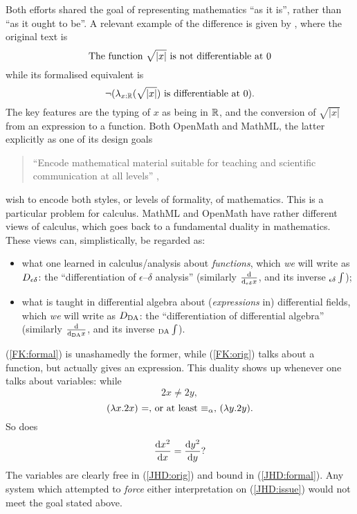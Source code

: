 \documentclass{llncs}
\begin{document}
Both efforts shared the goal of representing mathematics ``as it is'', rather
than ``as it ought to be''. A relevant example of the difference is given by
\cite{KamareddineNederpelt2004}, where the original text is 
\begin{equation}\label{FK:orig}
\hbox{The function }\sqrt{|x|} \hbox{ is not differentiable at 0}
\end{equation}
while its formalised equivalent is
\begin{equation}\label{FK:formal}
\lnot(\lambda_{x:\mathbb{R}}(\sqrt{|x|}) \hbox{ is differentiable at 0}).
\end{equation}
The key features are the typing of $x$ as being in $\mathbb{R}$, and the
conversion of $\sqrt{|x|}$ from an expression to a function. Both OpenMath and
MathML, the latter explicitly as one of its design goals
\begin{quote}
``Encode mathematical material suitable for teaching and scientific
communication at all levels'' \cite[1.2.4]{WorldWideWebConsortium2003b},
\end{quote}
wish to encode both styles, or levels of formality, of mathematics. This is a
particular problem for calculus.
MathML and OpenMath have rather different views of calculus, which goes back to a
fundamental duality in mathematics. These views can, simplistically, be regarded as:
\begin{itemize}
\item what one learned in calculus/analysis about {\it functions\/}, which
{\emph{we}} will write as $D_{\epsilon\delta}$: the
  ``differentiation of $\epsilon$--$\delta$ analysis'' (similarly $\frac{{\rm d}}{{\rm d}_{\epsilon\delta}x}$, and its
  inverse ${}_{\epsilon\delta}\int$);
\item what is taught in differential algebra about ({\it expressions\/} in)
differential fields, which {\emph{we}} will write as $D_{\rm DA}$: the
  ``differentiation of differential algebra'' (similarly $\frac{{\rm d}}{{\rm d}_{\rm DA}x}$, and
its inverse ${}_{\rm DA}\int$).
\end{itemize}
(\ref{FK:formal}) is unashamedly the former, while (\ref{FK:orig}) talks about
a function, but actually gives an expression. This duality shows up whenever
one talks about variables: while
\begin{equation}\label{JHD:orig}
2x \ne 2y,
\end{equation}
\begin{equation}\label{JHD:formal}
(\lambda x. 2x) \hbox{ =, or at least $\equiv_\alpha$, } (\lambda y. 2y).
\end{equation}
So does 
\begin{equation}\label{JHD:issue}
\frac{{\rm d} x^2}{{\rm d}x} = \frac{{\rm d}y^2}{{\rm d}y} ?
\end{equation}
The variables are clearly free in (\ref{JHD:orig}) and bound in
(\ref{JHD:formal}). Any system which attempted to {\it force\/} either
interpretation on (\ref{JHD:issue}) would not meet the goal stated above.
\end{document}
